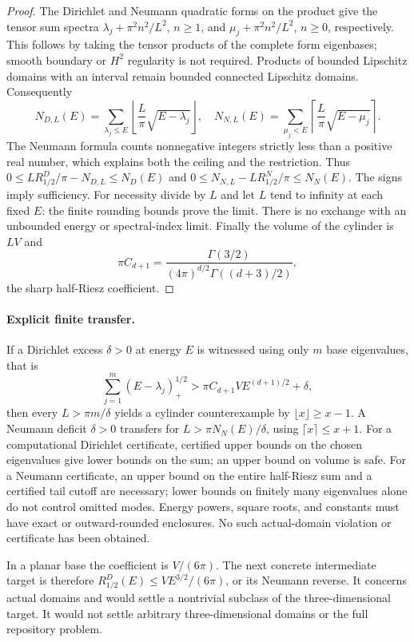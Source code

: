 \documentclass[11pt]{article}
\begin{document}
\begin{proof}
The Dirichlet and Neumann quadratic forms on the product give the tensor
sum spectra $\lambda_j+\pi^2n^2/L^2$, $n\geq1$, and
$\mu_j+\pi^2n^2/L^2$, $n\geq0$, respectively. This follows by taking the
tensor products of the complete form eigenbases; smooth boundary or $H^2$
regularity is not required. Products of bounded Lipschitz domains with an
interval remain bounded connected Lipschitz domains. Consequently
\[
 N_{D,L}(E)=\sum_{\lambda_j\leq E}
 \left\lfloor\frac L\pi\sqrt{E-\lambda_j}\right\rfloor,
\quad
 N_{N,L}(E)=\sum_{\mu_j<E}
 \left\lceil\frac L\pi\sqrt{E-\mu_j}\right\rceil.
\]
The Neumann formula counts nonnegative integers strictly less than a
positive real number, which explains both the ceiling and the restriction.
Thus $0\leq LR_{1/2}^D/\pi-N_{D,L}\leq N_D(E)$ and
$0\leq N_{N,L}-LR_{1/2}^N/\pi\leq N_N(E)$.
The signs imply sufficiency. For necessity divide by $L$ and let $L$ tend
to infinity at each fixed $E$: the finite rounding bounds prove the limit.
There is no exchange with an unbounded energy or spectral-index limit.
Finally the volume of the cylinder is $LV$ and
\[
 \pi C_{d+1}=\frac{\Gamma(3/2)}{(4\pi)^{d/2}\Gamma((d+3)/2)},
\]
the sharp half-Riesz coefficient.
\end{proof}

\paragraph{Explicit finite transfer.}
If a Dirichlet excess $\delta>0$ at energy $E$ is witnessed using only
$m$ base eigenvalues, that is
\[
 \sum_{j=1}^m(E-\lambda_j)_+^{1/2}
 >\pi C_{d+1}VE^{(d+1)/2}+\delta,
\]
then every $L>\pi m/\delta$ yields a cylinder counterexample by
$\lfloor x\rfloor\geq x-1$. A Neumann deficit $\delta>0$ transfers for
$L>\pi N_N(E)/\delta$, using $\lceil x\rceil\leq x+1$.
For a computational Dirichlet certificate, certified upper bounds on the
chosen eigenvalues give lower bounds on the sum; an upper bound on volume
is safe. For a Neumann certificate, an upper bound on the entire half-Riesz
sum and a certified tail cutoff are necessary; lower bounds on finitely
many eigenvalues alone do not control omitted modes. Energy powers, square
roots, and constants must have exact or outward-rounded enclosures.
No such actual-domain violation or certificate has been obtained.

In a planar base the coefficient is $V/(6\pi)$. The next concrete
intermediate target is therefore $R_{1/2}^D(E)\leq VE^{3/2}/(6\pi)$,
or its Neumann reverse. It concerns actual domains and would settle a
nontrivial subclass of the three-dimensional target. It would not settle
arbitrary three-dimensional domains or the full repository problem.
\end{document}
